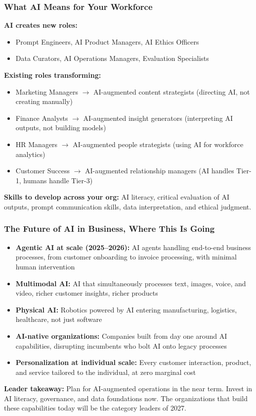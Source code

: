 \begin{frame}[fragile]\frametitle{What AI Means for Your Workforce}

\textbf{AI creates new roles:}
\begin{itemize}
  \item Prompt Engineers, AI Product Managers, AI Ethics Officers
  \item Data Curators, AI Operations Managers, Evaluation Specialists
\end{itemize}

\textbf{Existing roles transforming:}
\begin{itemize}
  \item Marketing Managers $\rightarrow$ AI-augmented content strategists (directing AI, not creating manually)
  \item Finance Analysts $\rightarrow$ AI-augmented insight generators (interpreting AI outputs, not building models)
  \item HR Managers $\rightarrow$ AI-augmented people strategists (using AI for workforce analytics)
  \item Customer Success $\rightarrow$ AI-augmented relationship managers (AI handles Tier-1, humans handle Tier-3)
\end{itemize}

\textbf{Skills to develop across your org:} AI literacy, critical evaluation of AI outputs, prompt communication skills, data interpretation, and ethical judgment.

\end{frame}

\begin{frame}[fragile]\frametitle{The Future of AI in Business, Where This Is Going}

\begin{itemize}
  \item \textbf{Agentic AI at scale (2025--2026):} AI agents handling end-to-end business processes, from customer onboarding to invoice processing, with minimal human intervention
  \item \textbf{Multimodal AI:} AI that simultaneously processes text, images, voice, and video, richer customer insights, richer products
  \item \textbf{Physical AI:} Robotics powered by AI entering manufacturing, logistics, healthcare, not just software
  \item \textbf{AI-native organizations:} Companies built from day one around AI capabilities, disrupting incumbents who bolt AI onto legacy processes
  \item \textbf{Personalization at individual scale:} Every customer interaction, product, and service tailored to the individual, at zero marginal cost
\end{itemize}

\textbf{Leader takeaway:} Plan for AI-augmented operations in the near term. Invest in AI literacy, governance, and data foundations now. The organizations that build these capabilities today will be the category leaders of 2027.

\end{frame}

